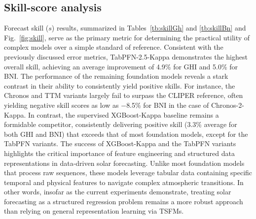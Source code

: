 \documentclass[number, 3p, 10pt, times]{elsarticle}
\begin{document}
\subsection{Skill-score analysis}
Forecast skill ($s$) results, summarized in Tables~\ref{tb:skillGh} and \ref{tb:skillBn} and Fig.~\ref{fig:skill}, serve as the primary metric for determining the practical utility of complex models over a simple standard of reference. Consistent with the previously discussed error metrics, TabPFN-2.5-Kappa demonstrates the highest overall skill, achieving an average improvement of 4.9\% for GHI and 5.0\% for BNI. The performance of the remaining foundation models reveals a stark contrast in their ability to consistently yield positive skills. For instance, the Chronos and TTM variants largely fail to surpass the CLIPER reference, often yielding negative skill scores as low as $-$8.5\% for BNI in the case of Chronos-2-Kappa. In contrast, the supervised XGBoost-Kappa baseline remains a formidable competitor, consistently delivering positive skill (3.3\% average for both GHI and BNI) that exceeds that of most foundation models, except for the TabPFN variants. The success of XGBoost-Kappa and the TabPFN variants highlights the critical importance of feature engineering and structured data representations in data-driven solar forecasting. Unlike most foundation models that process raw sequences, these models leverage tabular data containing specific temporal and physical features to navigate complex atmospheric transitions. In other words, insofar as the current experiments demonstrate, treating solar forecasting as a structured regression problem remains a more robust approach than relying on general representation learning via TSFMs. 
\end{document}

